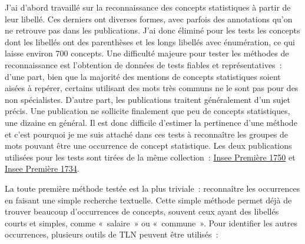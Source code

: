 J'ai d'abord travaillé sur la reconnaissance des concepts statistiques à partir de leur libellé. Ces derniers ont diverses formes, avec parfois des annotations qu'on ne retrouve pas dans les publications. J'ai donc éliminé pour les tests les concepts dont les libellés ont des parenthèses et les longs libellés avec énumération, ce qui laisse environ 700 concepts. Une difficulté majeure pour tester les méthodes de reconnaissance est l'obtention de données de tests fiables et représentatives~: d'une part, bien que la majorité des mentions de concepts statistiques soient aisées à repérer, certains utilisant des mots très communs ne le sont pas pour des non spécialistes. D'autre part, les publications traitent généralement d'un sujet précis. Une publication ne sollicite finalement que peu de concepts statistiques, une dizaine en général. Il est donc difficile d'estimer la pertinence d'une méthode et c'est pourquoi je me suis attaché dans ces tests à reconnaître les groupes de mots pouvant être une occurrence de concept statistique. Les deux publications utilisées pour les tests sont tirées de la même collection~: \href{https://insee.fr/fr/statistiques/4129807}{Insee Première 1750} et \href{https://insee.fr/fr/statistiques/3703745}{Insee Première 1734}.
\newline

La toute première méthode testée est la plus triviale~: reconnaître les occurrences en faisant une simple recherche textuelle. Cette simple méthode permet déjà de trouver beaucoup d'occurrences de concepts, souvent ceux ayant des libellés courts et simples, comme «~salaire~» ou «~commune~». Pour identifier les autres occurrences, plusieurs outils de TLN peuvent être utilisés~:
\newline

